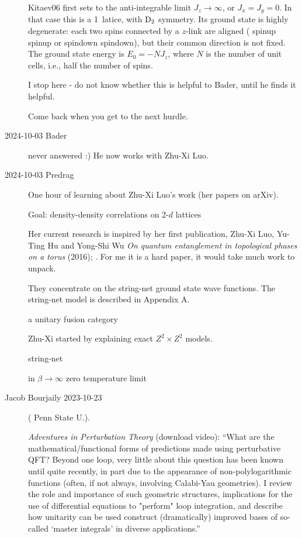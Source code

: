 \begin{description}
Kitaev06 first sets to the anti-integrable limit $J_{z}\to\infty$,
or $J_{x}=J_{y}=0$.
In that case this is a 1\dmn\ latice,
with  $\textrm{D}_{2}$ symmetry. Its ground state is highly
degenerate: each two spins connected by a $z$-link are aligned
( spinup spinup  or  spindown spindown), but their common direction is
not fixed.
The ground state energy is $E_{0}=-NJ_{z}$,
where $N$ is the number of unit cells, i.e., half the number of spins.

I stop here - do not know whether this is helpful to Bader,
until he finds it helpful.

Come back when you get to the next hurdle.


\item[2024-10-03 Bader] never answered :) He now works with Zhu-Xi Luo.

\item[2024-10-03 Predrag] One hour of learning about
 {Zhu-Xi Luo}'s work (her papers on
{arXiv}).

Goal: density-density correlations on 2-$d$ lattices

Her current research is inspired by her first publication,
Zhu-Xi Luo, Yu-Ting Hu and Yong-Shi Wu
{\em On quantum entanglement in topological phases on a torus}  (2016);
.
For me it is a hard paper, it would take much work to unpack.

They concentrate on the string-net ground state wave functions.
The string-net model is described in Appendix A.

 a unitary fusion category

Zhu-Xi started by explaining exact $Z^2\times Z^2$ models.

string-net

in $\beta\to\infty$ zero temperature limit




\item[Jacob Bourjaily  2023-10-23]
( {Penn State U.}).

{\em Adventures in Perturbation Theory}
{(download video)}:
``What are the mathematical/functional forms of predictions made using
perturbative QFT? Beyond one loop, very little about this question has
been known until quite recently, in part due to the appearance of
non-polylogarithmic functions (often, if not always, involving Calabi-Yau
geometries). I review the role and importance of such geometric
structures, implications for the use of differential equations to
"perform" loop integration, and describe how unitarity can be used
construct (dramatically) improved bases of so-called `master integrals'
in diverse applications.''


\end{description}
